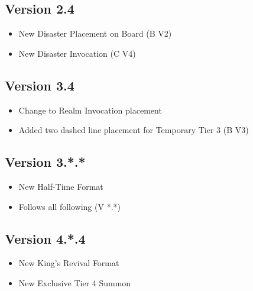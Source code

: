 \documentclass[12pt, letterpaper]{article}
\begin{document}
\subsection{Version 2.4}
\begin{itemize}
    \item New Disaster Placement on Board (B V2)
    \item New Disaster Invocation (C V4)
\end{itemize}
%
\subsection{Version 3.4}
\begin{itemize}
    \item Change to Realm Invocation placement
    \item Added two dashed line placement for Temporary Tier 3 (B V3)
\end{itemize}
%
\subsection{Version 3.*.*}
\begin{itemize}
    \item New Half-Time Format 
    \item Follows all following (V *.*)
\end{itemize}
%
\subsection{Version 4.*.4}
\begin{itemize}
    \item New King's Revival Format
    \item New Exclusive Tier 4 Summon
\end{itemize}
\end{document}
